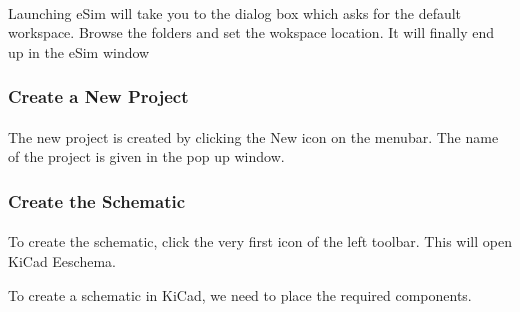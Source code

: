 \paragraph{}
 Launching eSim will take you to the dialog box which asks for the default workspace. Browse the folders and set the wokspace location. It will finally end up in the eSim window %

\subsubsection{Create a New Project}

\paragraph{ } The new project is created by clicking the New icon on the
menubar. The name of the project is given in the pop up window.%

\subsubsection{Create the Schematic}

\paragraph{}  To create the schematic, click the very first icon of the
left toolbar.%
This will open KiCad Eeschema.



To create a schematic in KiCad, we need to place the required components. %


